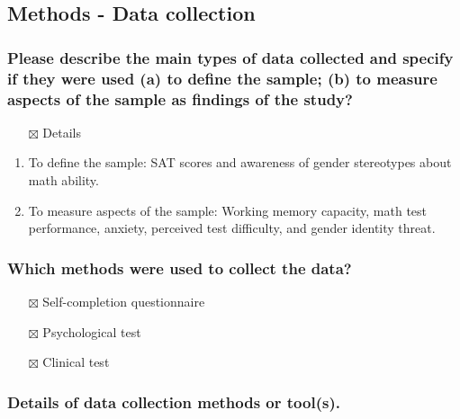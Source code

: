 \documentclass[
  doc, a4paper]{apa7}
\providecommand{\tightlist}{%
  \setlength{\itemsep}{0pt}\setlength{\parskip}{0pt}}
\begin{document}
\subsection{Methods - Data collection}\label{methods---data-collection}

\subsubsection{Please describe the main types of data collected and specify if they were used (a) to define the sample; (b) to measure aspects of the sample as findings of the study?}\label{please-describe-the-main-types-of-data-collected-and-specify-if-they-were-used-a-to-define-the-sample-b-to-measure-aspects-of-the-sample-as-findings-of-the-study}

\begin{itemize}
\tightlist
\item[$\boxtimes$]
  Details
\end{itemize}

\begin{enumerate}
\def\labelenumi{(\alph{enumi})}
\tightlist
\item
  To define the sample: SAT scores and awareness of gender stereotypes about math ability.
\item
  To measure aspects of the sample: Working memory capacity, math test performance, anxiety, perceived test difficulty, and gender identity threat.
\end{enumerate}

\subsubsection{Which methods were used to collect the data?}\label{which-methods-were-used-to-collect-the-data}

\begin{itemize}
\tightlist
\item[$\boxtimes$]
  Self-completion questionnaire
\item[$\boxtimes$]
  Psychological test
\item[$\boxtimes$]
  Clinical test
\end{itemize}

\subsubsection{Details of data collection methods or tool(s).}\label{details-of-data-collection-methods-or-tools.}
\end{document}
